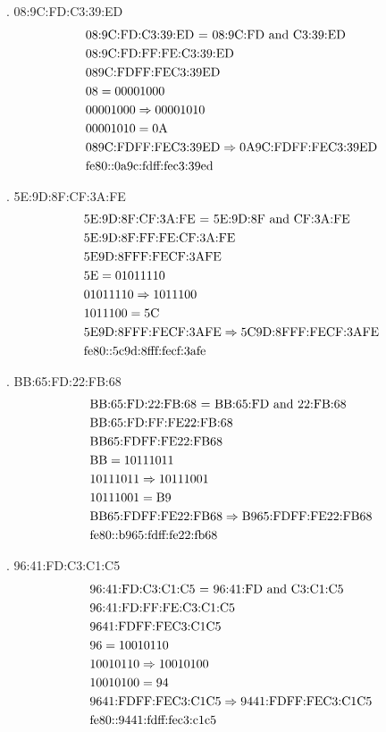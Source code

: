 \documentclass[11pt]{article}
\newcommand*{\vs}{\vspace{1cm}}
\newcommand*{\next}{\noindent}
\newcommand*{\set}{\setcounter{equation}{0}}
\begin{document}
\newpage\next
2. 08:9C:FD:C3:39:ED
\begin{align}
    \set
    &\text{08:9C:FD:C3:39:ED = 08:9C:FD and C3:39:ED}\\
    &\text{08:9C:FD:FF:FE:C3:39:ED}\\
    &\text{089C:FDFF:FEC3:39ED}\\
    &08=00001000\\
    &00001000\Rightarrow 00001010\\
    &00001010=\text{0A}\\
    &\text{089C:FDFF:FEC3:39ED}\Rightarrow\text{0A9C:FDFF:FEC3:39ED}\\
    &\lowercase\text{FE80::0A9C:FDFF:FEC3:39ED}
\end{align}

\vs\next
3. 5E:9D:8F:CF:3A:FE
\begin{align}
    \set
    &\text{5E:9D:8F:CF:3A:FE = 5E:9D:8F and CF:3A:FE}\\
    &\text{5E:9D:8F:FF:FE:CF:3A:FE}\\
    &\text{5E9D:8FFF:FECF:3AFE}\\
    &\text{5E}=01011110\\
    &01011110\Rightarrow 1011100\\
    &1011100=\text{5C}\\
    &\text{5E9D:8FFF:FECF:3AFE}\Rightarrow\text{5C9D:8FFF:FECF:3AFE}\\
    &\lowercase\text{FE80::5C9D:8FFF:FECF:3AFE}
\end{align}

\vs\next
4. BB:65:FD:22:FB:68
\begin{align}
    \set
    &\text{BB:65:FD:22:FB:68 = BB:65:FD and 22:FB:68}\\
    &\text{BB:65:FD:FF:FE22:FB:68}\\
    &\text{BB65:FDFF:FE22:FB68}\\
    &\text{BB}=10111011\\
    &10111011\Rightarrow 10111001\\
    &10111001=\text{B9}\\
    &\text{BB65:FDFF:FE22:FB68}\Rightarrow\text{B965:FDFF:FE22:FB68}\\
    &\lowercase\text{FE80::B965:FDFF:FE22:FB68}
\end{align}

\vs\next
5. 96:41:FD:C3:C1:C5
\begin{align}
    \set
    &\text{96:41:FD:C3:C1:C5 = 96:41:FD and C3:C1:C5}\\
    &\text{96:41:FD:FF:FE:C3:C1:C5}\\
    &\text{9641:FDFF:FEC3:C1C5}\\
    &\text{96}=10010110\\
    &10010110\Rightarrow 10010100\\
    &10010100=\text{94}\\
    &\text{9641:FDFF:FEC3:C1C5}\Rightarrow\text{9441:FDFF:FEC3:C1C5}\\
    &\lowercase\text{FE80::9441:FDFF:FEC3:C1C5}
\end{align}
\end{document}
